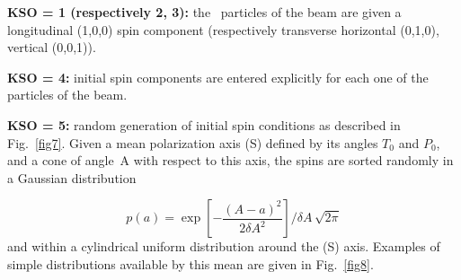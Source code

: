 \noindent\textbf{KSO = 1  (respectively 2, 3):} the \IMAX\ particles
of the beam are given a longitudinal (1,0,0) spin component (respectively 
transverse horizontal (0,1,0), vertical (0,0,1)).  
\medskip

\noindent\textbf{KSO = 4:} initial spin components are entered explicitly for
each one of the \IMAX{} particles of the beam.  
\medskip

\noindent\textbf{KSO = 5:} random generation of \IMAX{} initial spin
conditions as described in Fig.~\ref{fig7}.  
Given a mean polarization axis (S) defined by its angles $ T_0 $ and $ P_0 $, 
and a cone of angle~A with respect to this axis, the \IMAX{} spins are sorted randomly in a 
Gaussian distribution

$$ p(a) = \exp \left[- \frac{(A-a)^2 }{ 2\delta A^2} \right]/ \delta A\,  \sqrt{2\pi}   $$
%
and within a cylindrical uniform distribution around the (S) 
axis. Examples of simple distributions available by this mean are 
given in Fig.~\ref{fig8}.  


